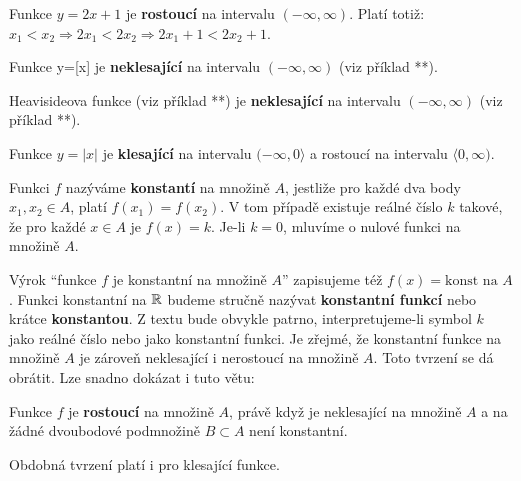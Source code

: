         \begin{example}
          Funkce $y=2x+1$ je \textbf{rostoucí} na intervalu $(-\infty, \infty)$. Platí totiž: $x_1<x_2\Rightarrow 2x_1<2x_2\Rightarrow2x_1+1<2x_2+1$.
        \end{example}
        \begin{example}
          Funkce y=[x] je \textbf{neklesající} na intervalu $(-\infty, \infty)$ (viz příklad **). 
        \end{example}
        \begin{example}
          Heavisideova funkce (viz příklad **) je \textbf{neklesající} na intervalu $(-\infty, \infty)$ (viz příklad **). 
        \end{example}       
        \begin{example}
          Funkce $y=|x|$ je \textbf{klesající} na intervalu $(-\infty, 0\rangle$ a rostoucí na intervalu $\langle0, \infty)$. 
        \end{example}  
            
        \begin{definition}\label{MA1:def_lim03}
          Funkci $f$ nazýváme \textbf{konstantí} na množině $A$, jestliže pro každé dva body $x_1, x_2\in A$, platí $f(x_1)=f(x_2)$. V tom případě existuje reálné číslo $k$ 
          takové, že pro každé $x\in A$ je $f(x)=k$. Je-li $k=0$, mluvíme o nulové funkci na množině $A$. 
        \end{definition} 
          
        Výrok ``funkce $f$ je konstantní na množině $A$'' zapisujeme též $f(x)=\text{konst na }A$. Funkci konstantní na $\mathbb{R}$ budeme stručně nazývat \textbf{konstantní funkcí}
        nebo krátce \textbf{konstantou}. Z textu bude obvykle patrno, interpretujeme-li symbol $k$ jako reálné číslo nebo jako konstantní funkci. Je zřejmé, že konstantní funkce
        na množině $A$ je zároveň neklesající i nerostoucí na množině $A$. Toto tvrzení se dá obrátit. Lze snadno dokázat i tuto větu:        
        \begin{lemma}\label{MA1:lem_lim01}
          Funkce $f$ je \textbf{rostoucí} na množině $A$, právě když je neklesající na množině $A$ a na žádné dvoubodové podmnožině $B\subset A$ není konstantní. 
        \end{lemma}
        Obdobná tvrzení platí i pro klesající funkce. 
               
